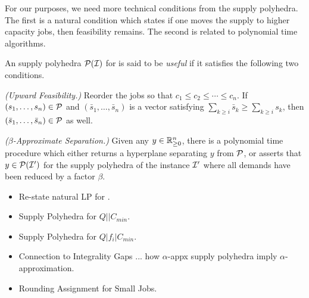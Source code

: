 For our purposes, we need more technical conditions from the supply polyhedra. The first is a natural condition which states if one moves the supply to higher capacity jobs, then feasibility remains.
The second is related to polynomial time algorithms.

\begin{definition}
	An supply polyhedra ${\cal P}({\cal I})$ for is said to be {\em useful} if it satisfies the following two conditions.
	\begin{asparaitem}
		\item[\emph{(Upward Feasibility.)}] Reorder the jobs so that $c_1\le c_2 \le \cdots \le c_n$.
		If $(s_1,\ldots,s_n)\in {\cal P}$ and $(\bar{s}_1,\ldots,\bar{s}_n)$ is a vector satisfying $\sum_{k\geq i} \bar{s}_k \geq \sum_{k\geq i} s_k$, then $(\bar{s}_1,\ldots,\bar{s}_n)\in {\cal P}$ as well.
		\item[\emph{($\beta$-Approximate Separation.)}] Given any $y\in \mathbb R^n_{\geq 0}$,  there is a polynomial time procedure which either returns a hyperplane separating $y$ from ${\cal P}$, or asserts that 
		$y\in {\cal P}({\cal I}')$ for the supply polyhedra of the instance ${\cal I}'$ where all demands have been reduced by a factor $\beta$.
	\end{asparaitem}
\end{definition}

\begin{itemize}[noitemsep]
	\item Re-state natural LP for \mckc.
	\item Supply Polyhedra for $Q||C_{min}$.
	\item Supply Polyhedra for $Q|f_i|C_{min}$.
	\item Connection to Integrality Gaps ... how $\alpha$-appx supply polyhedra imply $\alpha$-approximation.
	\item Rounding Assignment  for Small Jobs.
\end{itemize}